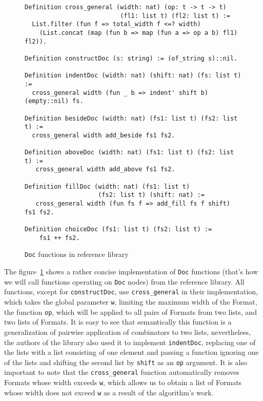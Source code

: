 \documentclass[14pt]{constructor-diploma}
\begin{document}
\begin{figure}[H]
\begin{mdframed}[backgroundcolor=bg]
\begin{verbatim}
Definition cross_general (width: nat) (op: t -> t -> t) 
                          (fl1: list t) (fl2: list t) :=
  List.filter (fun f => total_width f <=? width)
    (List.concat (map (fun b => map (fun a => op a b) fl1) fl2)).

Definition constructDoc (s: string) := (of_string s)::nil.

Definition indentDoc (width: nat) (shift: nat) (fs: list t) :=
  cross_general width (fun _ b => indent' shift b) (empty::nil) fs.

Definition besideDoc (width: nat) (fs1: list t) (fs2: list t) := 
  cross_general width add_beside fs1 fs2.

Definition aboveDoc (width: nat) (fs1: list t) (fs2: list t) := 
   cross_general width add_above fs1 fs2.

Definition fillDoc (width: nat) (fs1: list t) 
                    (fs2: list t) (shift: nat) :=
   cross_general width (fun fs f => add_fill fs f shift) fs1 fs2.

Definition choiceDoc (fs1: list t) (fs2: list t) := 
    fs1 ++ fs2.
\end{verbatim}
\end{mdframed}
\caption{\texttt{Doc} functions in reference library}
\label{fig:doc_functions}
\end{figure}

The figure~\ref{fig:doc_functions} shows a rather concise implementation of \texttt{Doc} functions (that's how we will call functions operating on \texttt{Doc} nodes) from the reference library. 
All functions, except for \texttt{constructDoc}, use \texttt{cross\_general} in their implementation, which takes the global parameter \texttt{w}, limiting the maximum width of the Format, the function \texttt{op}, which will be applied to all pairs of Formats from two lists, 
and two lists of Formats. It is easy to see that semantically this function is a generalization of pairwise application of combinators to two lists, nevertheless, the authors of the library also used it to implement \texttt{indentDoc}, replacing one of the lists with a list consisting of one element 
and passing a function ignoring one of the lists and shifting the second list by \texttt{shift} as an \texttt{op} argument.
It is also important to note that the \texttt{cross\_general} function automatically removes Formats whose width exceeds \texttt{w}, which allows us to obtain a list of Formats whose width does not exceed \texttt{w} as a result of the algorithm's work.
\end{document}
